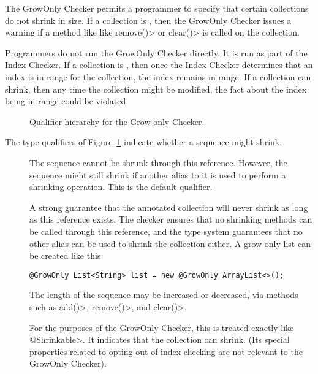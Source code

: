 The GrowOnly Checker permits a programmer to specify that certain
collections do not shrink in size.  If a collection is
, then the GrowOnly Checker
issues a warning if a method like like \<remove()> or \<clear()> is called
on the collection.

Programmers do not run the GrowOnly Checker directly.  It is run as part of
the Index Checker.  If a collection is
, then once the Index Checker
determines that an index is in-range for the collection, the index remains
in-range.  If a collection can shrink, then any time the collection might
be modified, the fact about the index being in-range could be violated.

\begin{figure}
\begin{center}
\end{center}
\caption{Qualifier hierarchy for the Grow-only Checker.}
\label{growonly-mutability-lattice}
\end{figure}

The type qualifiers of Figure~\ref{growonly-mutability-lattice} indicate whether a sequence might shrink.
\begin{description}
\item[]
  The sequence cannot be shrunk through this reference. However, the sequence might still shrink if another alias to it is used to perform a shrinking operation. This is the default qualifier.

\item[]
  A strong guarantee that the annotated collection will never shrink as long as this reference exists. The checker ensures that no shrinking methods can be called through this reference, and the type system guarantees that no other alias can be used to shrink the collection either.
  A grow-only list can be created like this:
\begin{Verbatim}
@GrowOnly List<String> list = new @GrowOnly ArrayList<>();
\end{Verbatim}

\item[]
  The length of the sequence may be increased or decreased, via methods such as \<add()>, \<remove()>, and \<clear()>.

\item[]
  For the purposes of the GrowOnly Checker, this is treated exactly like \<@Shrinkable>. It indicates that the collection can shrink. (Its special properties related to opting out of index checking are not relevant to the GrowOnly Checker).
\end{description}


